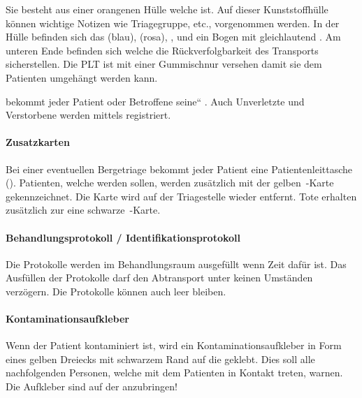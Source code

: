 Sie besteht aus einer orangenen Hülle welche 
ist. Auf dieser Kunststoffhülle können wichtige Notizen wie
Triagegruppe, etc., vorgenommen werden. In der Hülle befinden sich
das  (blau),  (rosa),
,  und ein Bogen mit gleichlautend
. Am unteren Ende befinden sich  welche die Rückverfolgbarkeit des Transports
sicherstellen. Die PLT ist mit einer Gummischnur versehen damit sie dem
Patienten umgehängt werden kann. 

 bekommt jeder Patient oder
Betroffene {\quotedblbase}seine{\textquotedblleft} . Auch Unverletzte
und Verstorbene werden mittels  registriert.

\paragraph{Zusatzkarten}

Bei einer eventuellen Bergetriage bekommt jeder Patient eine
Patientenleittasche (). Patienten, welche 
werden sollen, werden zusätzlich mit der gelben
{}\,-Karte
gekennzeichnet. Die Karte wird auf der Triagestelle wieder entfernt. Tote
erhalten zusätzlich zur  eine schwarze
{}\,-Karte.

\paragraph{Behandlungsprotokoll / Identifikationsprotokoll}

Die Protokolle werden im Behandlungsraum ausgefüllt wenn Zeit dafür
ist. Das Ausfüllen der Protokolle darf den Abtransport unter keinen
Umständen verzögern. Die Protokolle können auch leer bleiben.

\paragraph{Kontaminationsaufkleber}

Wenn der Patient kontaminiert ist, wird ein Kontaminationsaufkleber in
Form eines gelben Dreiecks mit schwarzem Rand auf die  geklebt. Dies soll
alle nachfolgenden Personen, welche mit dem Patienten in
Kontakt treten, warnen. Die Aufkleber sind auf  der  anzubringen!

